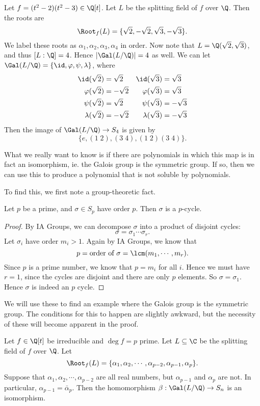 \documentclass[a4paper]{article}
\begin{document}
\begin{eg}
  Let $f = (t^2 - 2)(t^2 - 3) \in \Q[t]$. Let $L$ be the splitting field of $f$ over $\Q$. Then the roots are
  \[
    \Root_f(L) = \{\sqrt{2}, - \sqrt{2}, \sqrt{3}, -\sqrt{3}\}.
  \]
  We label these roots as $\alpha_1, \alpha_2, \alpha_3, \alpha_4$ in order. Now note that $L = \Q(\sqrt{2}, \sqrt{3})$, and thus $[L:\Q] = 4$. Hence $|\Gal(L/\Q)| = 4$ as well. We can let $\Gal(L/\Q) = \{\id, \varphi, \psi, \lambda\}$, where
  \begin{align*}
    \id(\sqrt{2}) &= \sqrt{2} & \id(\sqrt{3}) &= \sqrt{3}\\
    \varphi(\sqrt{2}) &= -\sqrt{2} & \varphi(\sqrt{3}) &= \sqrt{3}\\
    \psi(\sqrt{2}) &= \sqrt{2} & \psi(\sqrt{3}) &= -\sqrt{3}\\
    \lambda(\sqrt{2}) &= -\sqrt{2} & \lambda(\sqrt{3}) &= -\sqrt{3}
  \end{align*}
  Then the image of $\Gal(L/\Q) \to S_4$ is given by
  \[
    \{e, (1\; 2), (3\; 4), (1\; 2)(3\; 4)\}.
  \]
\end{eg}

What we really want to know is if there are polynomials in which this map is in fact an isomorphism, ie. the Galois group is the symmetric group. If so, then we can use this to produce a polynomial that is not soluble by polynomials.

To find this, we first note a group-theoretic fact.
\begin{lemma}
  Let $p$ be a prime, and $\sigma \in S_p$ have order $p$. Then $\sigma$ is a $p$-cycle.
\end{lemma}

\begin{proof}
  By IA Groups, we can decompose $\sigma$ into a product of disjoint cycles:
  \[
    \sigma = \sigma_1 \cdots \sigma_r.
  \]
  Let $\sigma_i$ have order $m_i > 1$. Again by IA Groups, we know that
  \[
    p = \text{order of }\sigma = \lcm(m_1, \cdots, m_r).
  \]
  Since $p$ is a prime number, we know that $p = m_i$ for all $i$. Hence we must have $r = 1$, since the cycles are disjoint and there are only $p$ elements. So $\sigma = \sigma_1$. Hence $\sigma$ is indeed an $p$ cycle.
\end{proof}

We will use these to find an example where the Galois group is the symmetric group. The conditions for this to happen are slightly awkward, but the necessity of these will become apparent in the proof.
\begin{thm}
  Let $f \in \Q[t]$ be irreducible and $\deg f = p$ prime. Let $L\subseteq \C$ be the splitting field of $f$ over $\Q$. Let
  \[
    \Root_f(L) = \{\alpha_1, \alpha_2, \cdots, \alpha_{p - 2}, \alpha_{p - 1}, \alpha_p\}.
  \]
  Suppose that $\alpha_1, \alpha_2, \cdots, \alpha_{p - 2}$ are all real numbers, but $\alpha_{p - 1}$ and $\alpha_p$ are not. In particular, $\alpha_{p - 1} = \bar{\alpha}_p$. Then the homomorphism $\beta: \Gal(L/\Q) \to S_n$ is an isomorphism.
\end{thm}
\end{document}
